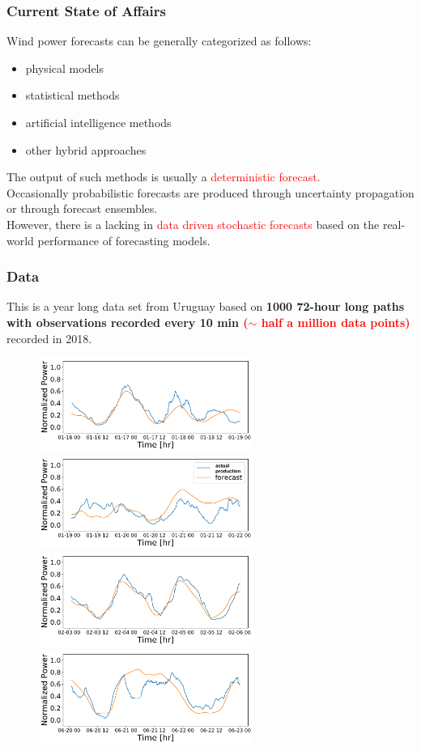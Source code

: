 \documentclass[aspectratio=169]{beamer}\usepackage[utf8]{inputenc}
\begin{document}
\begin{frame}\frametitle{Current State of Affairs}
  Wind power forecasts can be generally categorized as follows:
  \begin{itemize}
    \item physical models
    \item statistical methods
    \item artificial intelligence methods
    \item other hybrid approaches
  \end{itemize}
 The output of such methods is usually a \textcolor{red}{deterministic forecast}. \\
 \bigskip 
 Occasionally probabilistic forecasts are produced through uncertainty propagation or through forecast ensembles. \\
  \bigskip 
 However, there is a lacking in  \textcolor{red}{data driven stochastic forecasts} based on the real-world performance of forecasting models.
\end{frame}

\begin{frame}\frametitle{Data}
This is a year long data set from Uruguay based on \textbf{1000 72-hour long paths with observations recorded  every 10 min \textcolor{red}{ ($\sim$ half a million data points)}} recorded in 2018.
\begin{figure}
  \includegraphics[width=70mm,scale=1]{plots/data_1516064400.pdf}
  \includegraphics[width=70mm,scale=1]{plots/data_1516323600.pdf}\\
  \includegraphics[width=70mm,scale=1]{plots/data_1517619600.pdf}
  \includegraphics[width=70mm,scale=1]{plots/data_1529456400.pdf}
\end{figure}
\end{frame}
\end{document}
